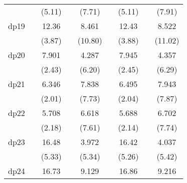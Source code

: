 {\begin{tabular}{l*{8}{c}}
            &                     &      (5.11)         &                     &      (7.71)         &                     &      (5.11)         &                     &      (7.91)         \\
[1em]
dp19        &                     &       12.36\sym{***}&                     &       8.461\sym{***}&                     &       12.43\sym{***}&                     &       8.522\sym{***}\\
            &                     &      (3.87)         &                     &     (10.80)         &                     &      (3.88)         &                     &     (11.02)         \\
[1em]
dp20        &                     &       7.901\sym{*}  &                     &       4.287\sym{***}&                     &       7.945\sym{*}  &                     &       4.357\sym{***}\\
            &                     &      (2.43)         &                     &      (6.20)         &                     &      (2.45)         &                     &      (6.29)         \\
[1em]
dp21        &                     &       6.346\sym{*}  &                     &       7.838\sym{***}&                     &       6.495\sym{*}  &                     &       7.943\sym{***}\\
            &                     &      (2.01)         &                     &      (7.73)         &                     &      (2.04)         &                     &      (7.87)         \\
[1em]
dp22        &                     &       5.708\sym{*}  &                     &       6.618\sym{***}&                     &       5.688\sym{*}  &                     &       6.702\sym{***}\\
            &                     &      (2.18)         &                     &      (7.61)         &                     &      (2.14)         &                     &      (7.74)         \\
[1em]
dp23        &                     &       16.48\sym{***}&                     &       3.972\sym{***}&                     &       16.42\sym{***}&                     &       4.037\sym{***}\\
            &                     &      (5.33)         &                     &      (5.34)         &                     &      (5.26)         &                     &      (5.42)         \\
[1em]
dp24        &                     &       16.73\sym{***}&                     &       9.129\sym{***}&                     &       16.86\sym{***}&                     &       9.216\sym{***}\\

\end{tabular}}
